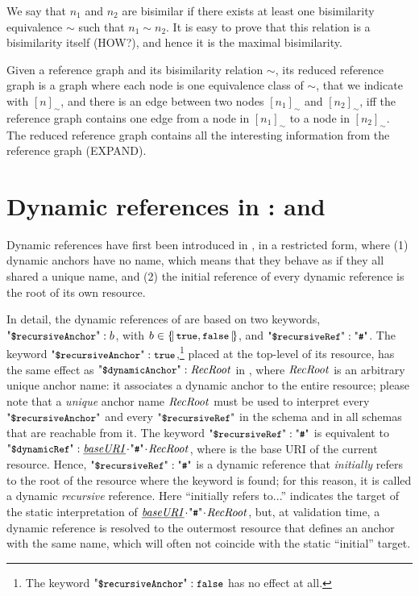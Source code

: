 {We say that $n_1$ and $n_2$ are bisimilar if there exists at least one bisimilarity equivalence $\sim$ such that $n_1\sim n_2$.
It is easy to prove that
this relation is a bisimilarity itself (HOW?), and hence it is the maximal bisimilarity.

\newcommand{\Class}[1]{\ensuremath{[{#1}]_{\sim}}}

Given a reference graph and its bisimilarity relation $\sim$, its reduced reference graph is a graph where each node is one equivalence class
of $\sim$, that we indicate with $\Class{n}$, and there is an edge between two nodes $\Class{n_1}$ and $\Class{n_2}$, iff the reference graph 
contains one edge from a node in  $\Class{n_1}$ to a node in $\Class{n_2}$.
The reduced reference graph contains all the interesting information from the reference graph (EXPAND).
}%



\section{Dynamic references in {\DNineteen}: {\qdrecA} and {\qdrRef}}


Dynamic references have first been introduced in {\DNineteen}, in a restricted form, 
where (1) dynamic anchors have no name, which means that they behave as if they all shared a
unique name, and (2) the initial reference of every dynamic reference is the root of its own resource.

In detail, the dynamic references of {\DNineteen} are based on two keywords, $\qdrecA : b$, with $b\in\{\!|\,{\mbox{\tt{\small true}},\mbox{\tt{\small false}}}\,|\!\}$,
and $\qdrRef: \qkw{\#}$.
The keyword $\qdrecA : \atrue$,\footnote{The
keyword $\qdrecA : \afalse$ has no effect at all.} placed at the top-level of its resource, has the same effect as 
$\qdda : \key{RecRoot}$ in {\DTwenty}, where $\mathit{RecRoot}$ is an arbitrary unique anchor name: it associates a dynamic anchor 
to the entire resource;
please note that a \emph{unique} anchor name $\mathit{RecRoot}$ must be used 
to interpret every $\qdrecA$ and every $\qdrRef$ in the schema and in all schemas that are reachable from it.
The keyword $\qdrRef: \qkw{\#}$ is equivalent to
$\qddref: \underline{\key{baseURI}}\catHash\key{RecRoot}$, where  is the base URI of the current resource.
Hence, $\qdrRef: \qkw{\#}$ is a dynamic reference that \emph{initially} refers
to the root of the resource where the keyword is found; for this reason, it is called a dynamic \emph{recursive}
reference.
Here ``initially refers to...'' indicates the target of the static interpretation of $\underline{\key{baseURI}}\catHash\key{RecRoot}$, 
but, at validation time, a dynamic reference is resolved to the outermost resource that defines an anchor with the same name,
which will often not coincide with the static ``initial'' target.

